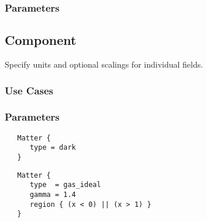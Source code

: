 \subsubsection{Parameters}

\subsection{ Component} \label{ss:component-matter}

 Specify units and optional scalings for individual
 fields.  

\subsubsection{Use Cases}

\subsubsection{Parameters}

\begin{verbatim}
   Matter {
      type = dark
   }
\end{verbatim}

\begin{verbatim}
   Matter {
      type  = gas_ideal
      gamma = 1.4
      region { (x < 0) || (x > 1) }
   }
\end{verbatim}
